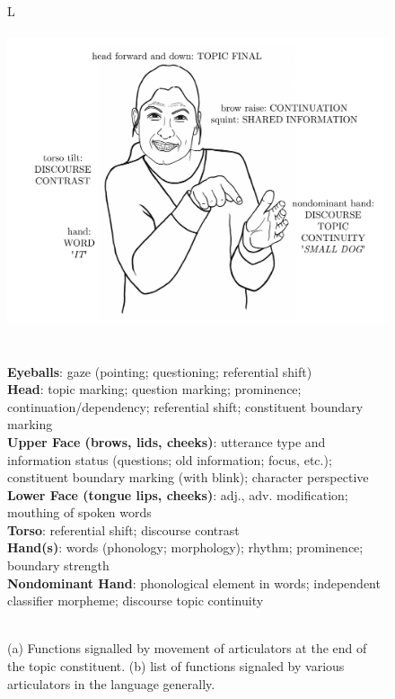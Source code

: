 \documentclass[output=paper]{langsci/langscibook}
\begin{document}
\begin{figure}
\begin{tabular}{L{\textwidth}}
{ }\\
\\
\includegraphics[width=\textwidth]{figures/sander-grammar-of-the-body-REVISED.pdf}\\
\hline
{ }\\
\\
\tabitem \footnotesize \textbf{Eyeballs}: gaze (pointing; questioning; referential shift)\\
\tabitem \footnotesize \textbf{Head}: topic marking; question marking; prominence; continuation/dependency; referential shift; constituent boundary marking\\
\tabitem \footnotesize \textbf{Upper Face (brows, lids, cheeks)}: utterance type and information status (questions; old information; focus, etc.); constituent boundary marking (with blink); character perspective\\
\tabitem \footnotesize \textbf{Lower Face (tongue lips, cheeks)}: adj., adv. modification; mouthing of spoken words\\
\tabitem \footnotesize \textbf{Torso}: referential shift; discourse contrast\\
\tabitem \footnotesize \textbf{Hand(s)}: words (phonology; morphology); rhythm; prominence; boundary strength\\
\tabitem \footnotesize \textbf{Nondominant Hand}: phonological element in words; independent classifier morpheme; discourse topic continuity\\
{ }\\
\end{tabular}
\caption{(a) Functions signalled by movement of articulators at the end of the topic constituent. (b) list of functions signaled by various articulators in the language generally.}
\label{fig:sandler:3}
\end{figure}
\end{document}
